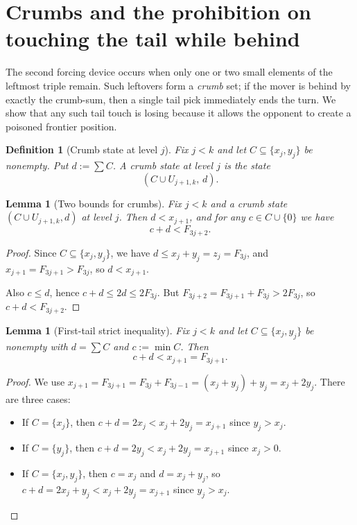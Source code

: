\documentclass[11pt]{article}
\newtheorem{lemma}[theorem]{Lemma}
\newtheorem{definition}[theorem]{Definition}
\begin{document}
\section{Crumbs and the prohibition on touching the tail while behind}

The second forcing device occurs when only one or two small elements of the leftmost triple remain.
Such leftovers form a \emph{crumb} set; if the mover is behind by exactly the crumb-sum, then a single tail pick immediately ends the turn.
We show that any such tail touch is losing because it allows the opponent to create a poisoned frontier position.

\begin{definition}[Crumb state at level $j$]\label{def:crumb}
Fix $j<k$ and let $C\subseteq\{x_j,y_j\}$ be nonempty. Put $d:=\sum C$.
A \emph{crumb state at level $j$} is the state
\[
(C\cup U_{j+1,k},\,d).
\]
\end{definition}

\begin{lemma}[Two bounds for crumbs]\label{lem:crumbbounds}
Fix $j<k$ and a crumb state $(C\cup U_{j+1,k},d)$ at level $j$.
Then $d<x_{j+1}$, and for any $c\in C\cup\{0\}$ we have
\[
c+d < F_{3j+2}.
\]
\end{lemma}

\begin{proof}
Since $C\subseteq\{x_j,y_j\}$, we have $d\le x_j+y_j=z_j=F_{3j}$, and $x_{j+1}=F_{3j+1}>F_{3j}$, so $d<x_{j+1}$.

Also $c\le d$, hence $c+d\le 2d\le 2F_{3j}$.
But $F_{3j+2}=F_{3j+1}+F_{3j}>2F_{3j}$, so $c+d<F_{3j+2}$.
\end{proof}

\begin{lemma}[First-tail strict inequality]\label{lem:firsttail}
Fix $j<k$ and let $C\subseteq\{x_j,y_j\}$ be nonempty with $d=\sum C$ and $c:=\min C$.
Then
\[
c+d < x_{j+1}=F_{3j+1}.
\]
\end{lemma}

\begin{proof}
We use $x_{j+1}=F_{3j+1}=F_{3j}+F_{3j-1}=(x_j+y_j)+y_j=x_j+2y_j$.
There are three cases:
\begin{itemize}
\item If $C=\{x_j\}$, then $c+d=2x_j<x_j+2y_j=x_{j+1}$ since $y_j>x_j$.
\item If $C=\{y_j\}$, then $c+d=2y_j<x_j+2y_j=x_{j+1}$ since $x_j>0$.
\item If $C=\{x_j,y_j\}$, then $c=x_j$ and $d=x_j+y_j$, so $c+d=2x_j+y_j<x_j+2y_j=x_{j+1}$ since $y_j>x_j$.
\end{itemize}
\end{proof}
\end{document}
